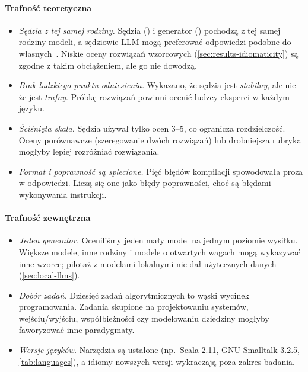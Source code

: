 \paragraph{Trafność teoretyczna}
\begin{itemize}
  \item \emph{Sędzia z tej samej rodziny.} Sędzia (\sonnet{}) i generator (\haiku{}) pochodzą
    z tej samej rodziny modeli, a sędziowie LLM mogą preferować odpowiedzi podobne do
    własnych~\cite{zheng2023judging,panickssery2024selfpreference}. Niskie oceny rozwiązań
    wzorcowych (\cref{sec:results-idiomaticity}) są zgodne z takim obciążeniem, ale go nie
    dowodzą.
  \item \emph{Brak ludzkiego punktu odniesienia.} Wykazano, że sędzia jest \emph{stabilny}, ale
    nie że jest \emph{trafny}. Próbkę rozwiązań powinni ocenić ludzcy eksperci w każdym języku.
  \item \emph{Ściśnięta skala.} Sędzia używał tylko ocen 3--5, co ogranicza rozdzielczość. Oceny
    porównawcze (szeregowanie dwóch rozwiązań) lub drobniejsza rubryka mogłyby lepiej rozróżniać
    rozwiązania.
  \item \emph{Format i poprawność są splecione.} Pięć błędów kompilacji spowodowała proza
    w odpowiedzi. Liczą się one jako błędy poprawności, choć są błędami wykonywania instrukcji.
\end{itemize}

\paragraph{Trafność zewnętrzna}
\begin{itemize}
  \item \emph{Jeden generator.} Oceniliśmy jeden mały model na jednym poziomie wysiłku. Większe
    modele, inne rodziny i modele o otwartych wagach mogą wykazywać inne wzorce; pilotaż z modelami
    lokalnymi nie dał użytecznych danych (\cref{sec:local-llms}).
  \item \emph{Dobór zadań.} Dziesięć zadań algorytmicznych to wąski wycinek programowania. Zadania
    skupione na projektowaniu systemów, wejściu/wyjściu, współbieżności czy modelowaniu dziedziny
    mogłyby faworyzować inne paradygmaty.
  \item \emph{Wersje języków.} Narzędzia są ustalone (np.\ Scala 2.11, GNU Smalltalk 3.2.5,
    \cref{tab:languages}), a idiomy nowszych wersji wykraczają poza zakres badania.
\end{itemize}

